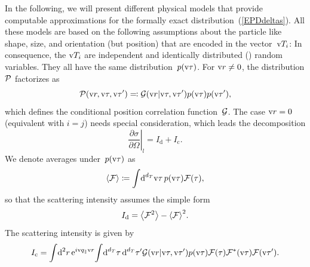In the following, we will present different physical models
that provide computable approximations
for the formally exact distribution~(\ref{EPDdeltas}).
All these models are based on the following assumptions
about the particle  like shape, size, and orientation
(but  position) that are  encoded in the vector~$\text{v} T_i$:
%
%
In consequence, the $\text{v} T_i$
are independent and identically distributed () random variables.
They all have the same distribution~$p(\text{v}\tau)$.
For $\text{v}{r}\ne0$, the distribution $\mathcal{P}$ factorizes as
\begin{equation}
  \mathcal{P}(\text{v}{r},\text{v}\tau,\text{v}\tau')\eqqcolon\mathcal{G}(\text{v}{r}|\text{v}\tau,\text{v}\tau')p(\text{v}\tau)p(\text{v}\tau'),
\end{equation}
which defines the conditional position correlation function~$\mathcal{G}$.
The case $\text{v}{r}=0$ (equivalent with $i=j$) needs special consideration,
which leads the decomposition
\Emph
{\begin{equation}
  \left.\frac{\partial\sigma}{\partial\Omega}\right|_l
  = I_\text{d}+I_\text{c}.
\end{equation}\vskip -5pt}
We denote averages under~$p(\text{v}\tau)$ as
\begin{equation}
  \left\langle\mathcal{F}\right\rangle \coloneqq  \int\!\text{d}^{d_T}\text{v}\tau\,p(\text{v}\tau)\mathcal{F}(\tau),
\end{equation}
so that the  scattering intensity assumes the simple form
%
%
\Emph
{\begin{equation}
  I_\text{d} = \left\langle\mathcal{F}^2\right\rangle-{\left\langle\mathcal{F}\right\rangle}^2.
\end{equation}\vskip -5pt}
The  scattering intensity is given by
\Emph
{\begin{equation}
  I_\text{c} =
  \int\!\text{d}^2r\,   \text{e}^{i\text{v}{q}_{\parallel}\text{v}{r}}\!
  \int\! \text{d}^{d_T}\tau\, \text{d}^{d_T}\tau'
    \mathcal{G}(\text{v}{r}|\text{v}\tau,\text{v}\tau')p(\text{v}\tau)\mathcal{F}(\tau)
    \mathcal{F}^*(\text{v}\tau) \mathcal{F}(\text{v}\tau').
\end{equation}\vskip -5pt}

